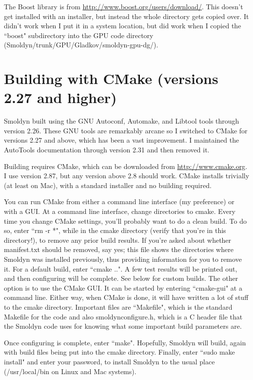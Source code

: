 \documentclass {book}
\begin{document}
The Boost library is from \url{http://www.boost.org/users/download/}.  This doesn't get installed with an installer, but instead the whole directory gets copied over.  It didn't work when I put it in a system location, but did work when I copied the ``boost" subdirectory into the GPU code directory (Smoldyn/trunk/GPU/Gladkov/smoldyn-gpu-dg/).

\section{Building with CMake (versions 2.27 and higher)}

Smoldyn built using the GNU Autoconf, Automake, and Libtool tools through version 2.26.  These GNU tools are remarkably arcane so I switched to CMake for versions 2.27 and above, which has been a vast improvement.  I maintained the AutoTools documentation through version 2.31 and then removed it.

Building requires CMake, which can be downloaded from \url{http://www.cmake.org}.  I use version 2.87, but any version above 2.8 should work.  CMake installs trivially (at least on Mac), with a standard installer and no building required.

You can run CMake from either a command line interface (my preference) or with a GUI.  At a command line interface, change directories to cmake.  Every time you change CMake settings, you'll probably want to do a clean build.  To do so, enter ``rm -r *", while in the cmake directory (verify that you're in this directory!), to remove any prior build results.  If you're asked about whether manifest.txt should be removed, say yes; this file shows the directories where Smoldyn was installed previously, thus providing information for you to remove it.  For a default build, enter ``cmake ..".  A few test results will be printed out, and then configuring will be complete.  See below for custom builds.  The other option is to use the CMake GUI.  It can be started by entering ``cmake-gui" at a command line.  Either way, when CMake is done, it will have written a lot of stuff to the cmake directory.  Important files are ``Makefile", which is the standard Makefile for the code and also smoldynconfigure.h, which is a C header file that the Smoldyn code uses for knowing what some important build parameters are.

Once configuring is complete, enter ``make".  Hopefully, Smoldyn will build, again with build files being put into the cmake directory.  Finally, enter ``sudo make install" and enter your password, to install Smoldyn to the usual place (/usr/local/bin on Linux and Mac systems).
\end{document}
